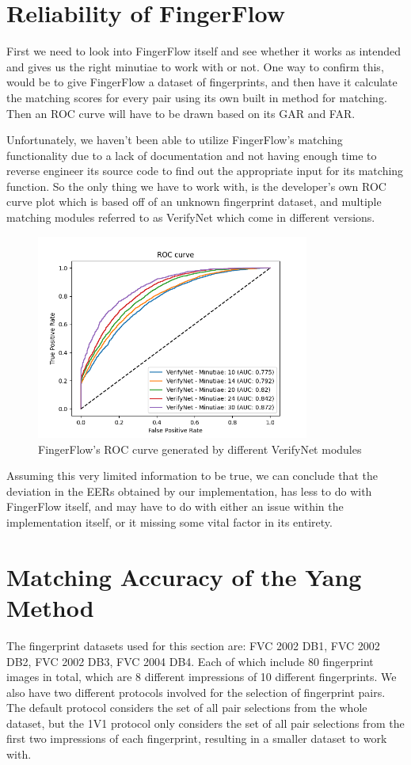 \documentclass[fyp]{socreport}
\begin{document}
\section{Reliability of FingerFlow}
First we need to look into FingerFlow itself and see whether it works as intended and gives us the right minutiae to work with or not. One way to confirm this, would be to give FingerFlow a dataset of fingerprints, and then have it calculate the matching scores for every pair using its own built in method for matching. Then an ROC curve will have to be drawn based on its GAR and FAR.

Unfortunately, we haven't been able to utilize FingerFlow's matching functionality due to a lack of documentation and not having enough time to reverse engineer its source code to find out the appropriate input for its matching function. So the only thing we have to work with, is the developer's own ROC curve plot which is based off of an unknown fingerprint dataset, and multiple matching modules referred to as VerifyNet which come in different versions.

\begin{figure}[H]
	\centering
	\includegraphics[width=0.8\textwidth]
	{fingerflow_roc}
	\caption{FingerFlow's ROC curve generated by different VerifyNet modules}
\end{figure}

Assuming this very limited information to be true, we can conclude that the deviation in the EERs obtained by our implementation, has less to do with FingerFlow itself, and may have to do with either an issue within the implementation itself, or it missing some vital factor in its entirety.

\section{Matching Accuracy of the Yang Method}
The fingerprint datasets used for this section are: FVC 2002 DB1, FVC 2002 DB2, FVC 2002 DB3, FVC 2004 DB4. Each of which include 80 fingerprint images in total, which are 8 different impressions of 10 different fingerprints. We also have two different protocols involved for the selection of fingerprint pairs. The default protocol considers the set of all pair selections from the whole dataset, but the 1V1 protocol only considers the set of all pair selections from the first two impressions of each fingerprint, resulting in a smaller dataset to work with.
\end{document}

